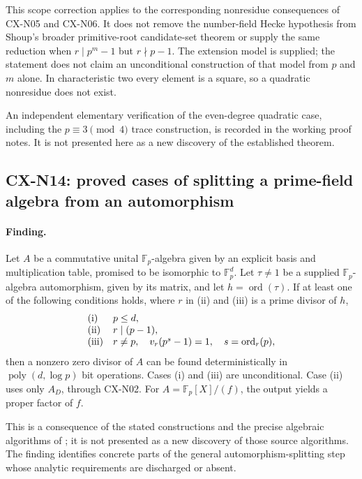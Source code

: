 \documentclass[11pt,a4paper]{article}
\begin{document}
This scope correction applies to the corresponding nonresidue
consequences of CX-N05 and CX-N06. It does not remove the
number-field Hecke hypothesis from Shoup's broader primitive-root
candidate-set theorem or supply the same reduction when
$r\mid p^m-1$ but $r\nmid p-1$. The extension model is supplied;
the statement does not claim an unconditional construction of that
model from $p$ and $m$ alone. In characteristic two every element
is a square, so a quadratic nonresidue does not exist.

An independent elementary verification of the even-degree quadratic
case, including the $p\equiv3\pmod4$ trace construction, is recorded
in the working proof notes. It is not presented here as a new
discovery of the established theorem.


\subsection{CX-N14: proved cases of splitting a prime-field algebra from an automorphism}
\label{finding:CX-N14}

\paragraph{Finding.}
Let \(A\) be a commutative unital \(\mathbb F_p\)-algebra
given by an explicit basis and multiplication table, promised to
be isomorphic to \(\mathbb F_p^d\).
Let \(\tau\ne1\) be a supplied \(\mathbb F_p\)-algebra automorphism,
given by its matrix, and let \(h=\operatorname{ord}(\tau)\).
If at least one of the following conditions holds, where
\(r\) in (ii) and (iii) is a prime divisor of \(h\),
\[
\begin{array}{ll}
\textnormal{(i)} & p\leq d,\\
\textnormal{(ii)} & r\mid(p-1),\\
\textnormal{(iii)} & r\ne p,\quad
 v_r\!\left(p^{s}-1\right)=1,\quad s=\operatorname{ord}_r(p),
\end{array}
\]
then a nonzero zero divisor of \(A\) can be found deterministically
in \(\operatorname{poly}(d,\log p)\) bit operations.
Cases (i) and (iii) are unconditional.
Case (ii) uses only \(A_D\), through CX-N02.
For \(A=\mathbb F_p[X]/(f)\), the output yields a proper factor of
\(f\).

This is a consequence of the stated constructions and the precise
algebraic algorithms of
\cite[Lemma~4.2 and Proposition~4.6]{CXNIKRS08};
it is not presented as a new discovery of those source algorithms.
The finding identifies concrete parts of the general
automorphism-splitting step whose analytic requirements are
discharged or absent.
\end{document}
